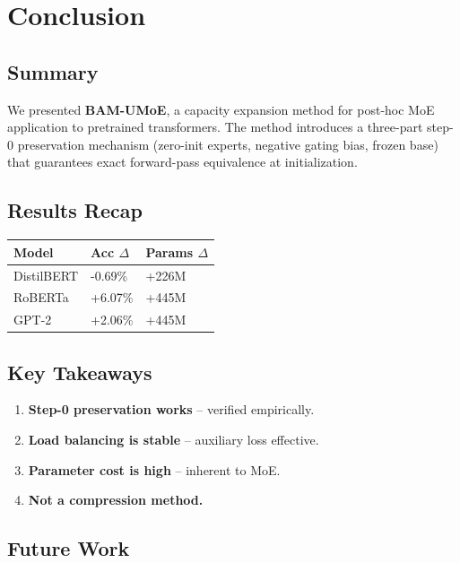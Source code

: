 \section{Conclusion}

\subsection{Summary}

We presented \textbf{BAM-UMoE}, a capacity expansion method for post-hoc MoE 
application to pretrained transformers. The method introduces a three-part 
step-0 preservation mechanism (zero-init experts, negative gating bias, 
frozen base) that guarantees exact forward-pass equivalence at 
initialization.

\subsection{Results Recap}

\begin{table}[H]
\centering
\small
\begin{tabular}{lll}
\toprule
\textbf{Model} & \textbf{Acc $\Delta$} & \textbf{Params $\Delta$} \\
\midrule
DistilBERT & -0.69\% & +226M \\
RoBERTa & +6.07\% & +445M \\
GPT-2 & +2.06\% & +445M \\
\bottomrule
\end{tabular}
\end{table}

\subsection{Key Takeaways}

\begin{enumerate}
\item \textbf{Step-0 preservation works} -- verified empirically.
\item \textbf{Load balancing is stable} -- auxiliary loss effective.
\item \textbf{Parameter cost is high} -- inherent to MoE.
\item \textbf{Not a compression method.}

\end{enumerate}
\subsection{Future Work}

